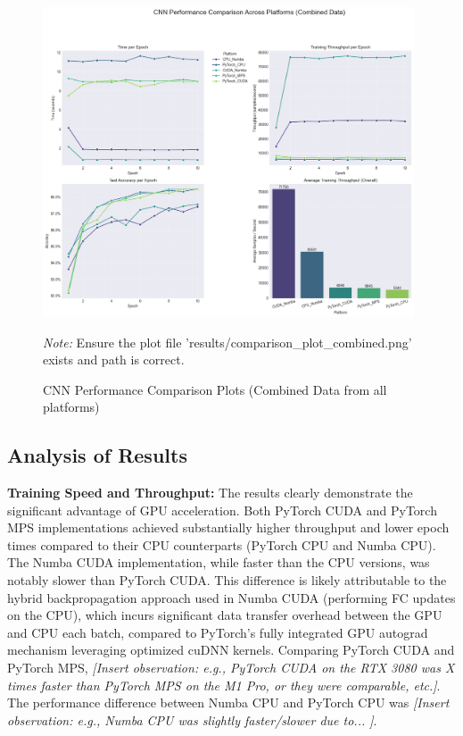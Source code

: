 \documentclass[conference]{IEEEtran} %
\begin{document}
\begin{figure}[htbp] %
    \centering
    \includegraphics[width=0.98\textwidth]{results/comparison_plot_combined.png} %
    \caption{CNN Performance Comparison Plots (Combined Data from all platforms)}
    \label{fig:results_plots} %
    \vspace{0.1cm}
    \footnotesize{\textit{Note:} Ensure the plot file 'results/comparison\_plot\_combined.png' exists and path is correct.}
\end{figure}

\subsection*{Analysis of Results} %

\textbf{Training Speed and Throughput:} The results clearly demonstrate the significant advantage of GPU acceleration. Both PyTorch CUDA and PyTorch MPS implementations achieved substantially higher throughput and lower epoch times compared to their CPU counterparts (PyTorch CPU and Numba CPU). The Numba CUDA implementation, while faster than the CPU versions, was notably slower than PyTorch CUDA. This difference is likely attributable to the hybrid backpropagation approach used in Numba CUDA (performing FC updates on the CPU), which incurs significant data transfer overhead between the GPU and CPU each batch, compared to PyTorch's fully integrated GPU autograd mechanism leveraging optimized cuDNN kernels. Comparing PyTorch CUDA and PyTorch MPS, \textit{[Insert observation: e.g., PyTorch CUDA on the RTX 3080 was X times faster than PyTorch MPS on the M1 Pro, or they were comparable, etc.]}. The performance difference between Numba CPU and PyTorch CPU was \textit{[Insert observation: e.g., Numba CPU was slightly faster/slower due to... ]}.
\end{document}
